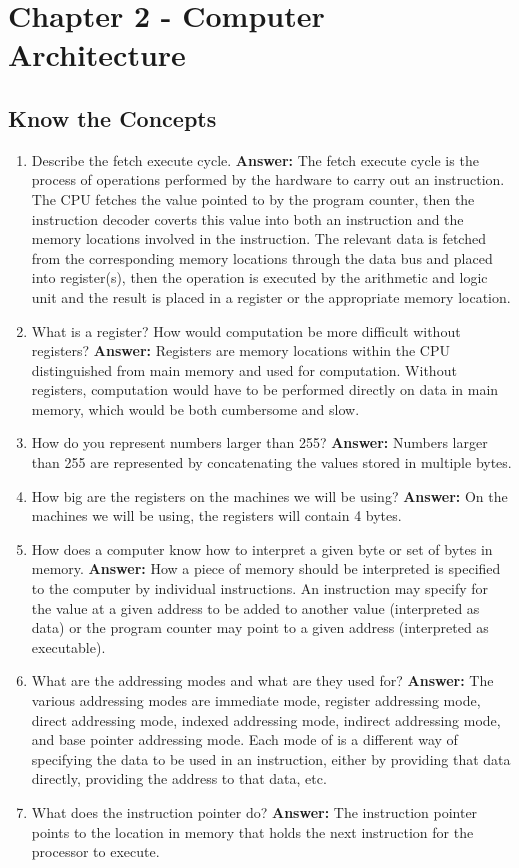 \documentclass[12pt]{article}
\begin{document}
\section*{Chapter 2 - Computer Architecture}

\subsection*{Know the Concepts}
\begin{enumerate}
    \item Describe the fetch execute cycle.
	    \textbf{Answer:} The fetch execute cycle is the process of operations performed by the hardware to carry out an instruction. The CPU fetches the value pointed to by the program counter, then the instruction decoder coverts this value into both an instruction and the memory locations involved in the instruction. The relevant data is fetched from the corresponding memory locations through the data bus and placed into register(s), then the operation is executed by the arithmetic and logic unit and the result is placed in a register or the appropriate memory location.
    \item What is a register? How would computation be more difficult without registers?
        \textbf{Answer:} Registers are memory locations within the CPU distinguished from main memory and used for computation. Without registers, computation would have to be performed directly on data in main memory, which would be both cumbersome and slow.
    \item How do you represent numbers larger than 255?
        \textbf{Answer:} Numbers larger than 255 are represented by concatenating the values stored in multiple bytes.
    \item How big are the registers on the machines we will be using?
        \textbf{Answer:} On the machines we will be using, the registers will contain 4 bytes.
    \item How does a computer know how to interpret a given byte or set of bytes in memory.
        \textbf{Answer:} How a piece of memory should be interpreted is specified to the computer by individual instructions. An instruction may specify for the value at a given address to be added to another value (interpreted as data) or the program counter may point to a given address (interpreted as executable).
    \item What are the addressing modes and what are they used for?
        \textbf{Answer:} The various addressing modes are immediate mode, register addressing mode, direct addressing mode, indexed addressing mode, indirect addressing mode, and base pointer addressing mode. Each mode of is a different way of specifying the data to be used in an instruction, either by providing that data directly, providing the address to that data, etc.
    \item What does the instruction pointer do?
        \textbf{Answer:} The instruction pointer points to the location in memory that holds the next instruction for the processor to execute.
\end{enumerate}
\end{document}
